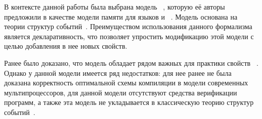 В контексте данной работы была выбрана модель \Wkm~\autocite{Chakraborty-Vafeiadis:POPL19},
которую её авторы  предложили в качестве модели памяти
для языков \CPP и \LLVM%
~\autocite{Chakraborty-Vafeiadis:CGO17}.
Модель \Wkm основана на теории структур событий~\autocite{Winskel:86,Winskel:ICALP1982}.
Преимуществом использования данного формализма является декларативность, что позволяет упростить  модификацию этой модели
с целью добавления в нее новых свойств.


Ранее было доказано, что модель \Wkm обладает рядом важных для практики свойств%
~\autocite{Chakraborty-Vafeiadis:POPL19}.
Однако у данной модели имеется ряд недостатков:
для нее ранее не была доказана корректность оптимальной схемы
компиляции в модели современных мультипроцессоров,
для данной модели отсутствуют средства верификации программ,
а также эта модель не укладывается в классическую теорию структур событий~\cite{Winskel:86}.




